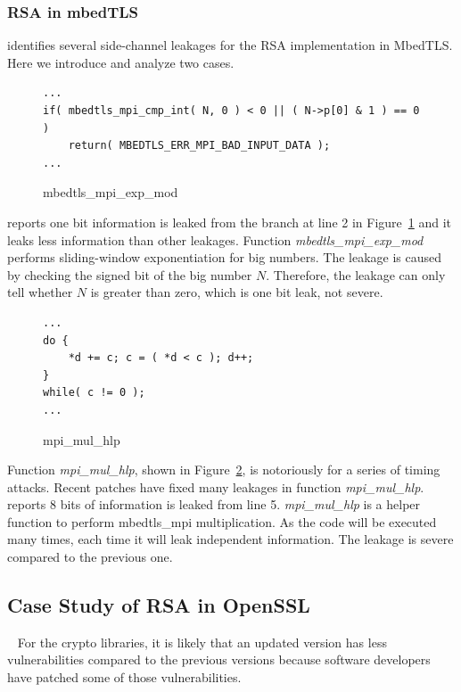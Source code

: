 \subsubsection{RSA in mbedTLS}
\tool{} identifies several side-channel leakages for the RSA implementation in
MbedTLS. Here we introduce and analyze two cases. 

\begin{figure}%
    \centering
    \begin{lstlisting}[xleftmargin=.02\textwidth,xrightmargin=.01\textwidth]
...
if( mbedtls_mpi_cmp_int( N, 0 ) < 0 || ( N->p[0] & 1 ) == 0 )
    return( MBEDTLS_ERR_MPI_BAD_INPUT_DATA );
...
\end{lstlisting}
    \caption{mbedtls\_mpi\_exp\_mod}
    \label{fig:mbedtls_rsa_1}
\end{figure}

\tool{} reports one bit information is leaked from the branch at line 2 in
Figure~\ref{fig:mbedtls_rsa_1} and it leaks less information than other
leakages. Function \emph{mbedtls\_mpi\_exp\_mod} performs sliding-window
exponentiation for big numbers. The leakage is caused by checking the signed bit
of the big number $N$. Therefore, the leakage can only tell whether $N$ is
greater than zero, which is one bit leak, not severe.


\begin{figure}%
    \centering
    \begin{lstlisting}[xleftmargin=.02\textwidth,xrightmargin=.01\textwidth]
...
do {
    *d += c; c = ( *d < c ); d++;
}
while( c != 0 );
...
\end{lstlisting}
    \caption{mpi\_mul\_hlp}
    \label{fig:mbedtls_rsa_2}
\end{figure}

Function \emph{mpi\_mul\_hlp}, shown in Figure~\ref{fig:mbedtls_rsa_2},
is notoriously for a series of timing attacks.
Recent patches have fixed many leakages in function \emph{mpi\_mul\_hlp}.
\tool{} reports 8 bits of information is leaked from line 5.
\emph{mpi\_mul\_hlp} is a helper function to perform mbedtls\_mpi
multiplication. As the code will be executed many times, each time it will leak
independent information. The leakage is severe compared to the previous one.

\subsection{Case Study of RSA in OpenSSL}~\label{sec::eval_rsa}
For the crypto libraries, it is likely that an updated version has less
vulnerabilities compared to the previous versions because software developers
have patched some of those vulnerabilities.

